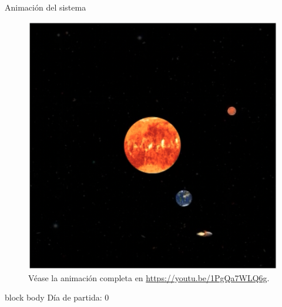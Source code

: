 \documentclass{beamer}
\begin{document}
            \begin{frame}{Animación del sistema}{}
                \vspace*{-0.3cm}
                \begin{minipage}[t]{0.49\textwidth}
                    \begin{figure}[H!]
                        \includegraphics[width=\textwidth]{./animacion_marte_1}
                        \caption*{Véase la animación completa en \url{https://youtu.be/1PgQa7WLQ6g}.}
                        \label{fig:marte_1}
                    \end{figure}
                    \vspace*{-0.5cm}
                    \begin{beamercolorbox}[sep=5pt,center]{block body}
                        \centering
                        \small{Día de partida: 0}
                    \end{beamercolorbox}
                \end{minipage}
                \hfill
                \begin{minipage}[t]{0.49\textwidth}
                    \begin{figure}[H!]

\end{figure}
\end{minipage}
\end{frame}
\end{document}
